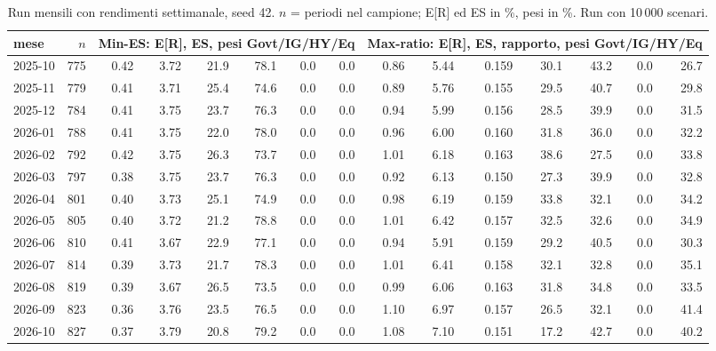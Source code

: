 \begin{table}[htbp]\centering\scriptsize\setlength{\tabcolsep}{3.5pt}
\caption{Run mensili con rendimenti settimanale, seed 42. $n$ = periodi nel campione; E[R] ed ES in \%, pesi in \%. Run con 10\,000 scenari.}\label{tab:runs_weekly_10k}
\begin{tabular}{lrrrrrrrrrrrrrr}\toprule
mese & $n$ & \multicolumn{6}{c}{Min-ES: E[R], ES, pesi Govt/IG/HY/Eq} & \multicolumn{7}{c}{Max-ratio: E[R], ES, rapporto, pesi Govt/IG/HY/Eq} \\\midrule
2025-10 & 775 & 0.42 & 3.72 & 21.9 & 78.1 & 0.0 & 0.0 & 0.86 & 5.44 & 0.159 & 30.1 & 43.2 & 0.0 & 26.7 \\
2025-11 & 779 & 0.41 & 3.71 & 25.4 & 74.6 & 0.0 & 0.0 & 0.89 & 5.76 & 0.155 & 29.5 & 40.7 & 0.0 & 29.8 \\
2025-12 & 784 & 0.41 & 3.75 & 23.7 & 76.3 & 0.0 & 0.0 & 0.94 & 5.99 & 0.156 & 28.5 & 39.9 & 0.0 & 31.5 \\
2026-01 & 788 & 0.41 & 3.75 & 22.0 & 78.0 & 0.0 & 0.0 & 0.96 & 6.00 & 0.160 & 31.8 & 36.0 & 0.0 & 32.2 \\
2026-02 & 792 & 0.42 & 3.75 & 26.3 & 73.7 & 0.0 & 0.0 & 1.01 & 6.18 & 0.163 & 38.6 & 27.5 & 0.0 & 33.8 \\
2026-03 & 797 & 0.38 & 3.75 & 23.7 & 76.3 & 0.0 & 0.0 & 0.92 & 6.13 & 0.150 & 27.3 & 39.9 & 0.0 & 32.8 \\
2026-04 & 801 & 0.40 & 3.73 & 25.1 & 74.9 & 0.0 & 0.0 & 0.98 & 6.19 & 0.159 & 33.8 & 32.1 & 0.0 & 34.2 \\
2026-05 & 805 & 0.40 & 3.72 & 21.2 & 78.8 & 0.0 & 0.0 & 1.01 & 6.42 & 0.157 & 32.5 & 32.6 & 0.0 & 34.9 \\
2026-06 & 810 & 0.41 & 3.67 & 22.9 & 77.1 & 0.0 & 0.0 & 0.94 & 5.91 & 0.159 & 29.2 & 40.5 & 0.0 & 30.3 \\
2026-07 & 814 & 0.39 & 3.73 & 21.7 & 78.3 & 0.0 & 0.0 & 1.01 & 6.41 & 0.158 & 32.1 & 32.8 & 0.0 & 35.1 \\
2026-08 & 819 & 0.39 & 3.67 & 26.5 & 73.5 & 0.0 & 0.0 & 0.99 & 6.06 & 0.163 & 31.8 & 34.8 & 0.0 & 33.5 \\
2026-09 & 823 & 0.36 & 3.76 & 23.5 & 76.5 & 0.0 & 0.0 & 1.10 & 6.97 & 0.157 & 26.5 & 32.1 & 0.0 & 41.4 \\
2026-10 & 827 & 0.37 & 3.79 & 20.8 & 79.2 & 0.0 & 0.0 & 1.08 & 7.10 & 0.151 & 17.2 & 42.7 & 0.0 & 40.2 \\
\bottomrule\end{tabular}\end{table}

